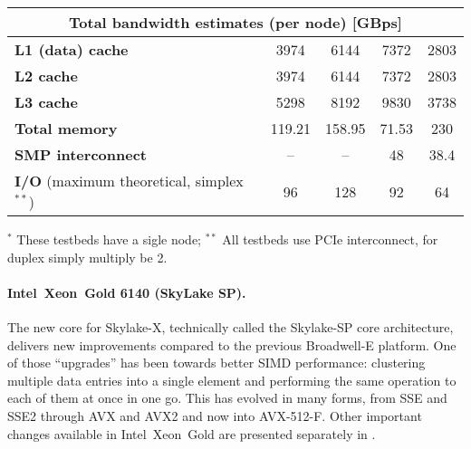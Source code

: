 \begin{table}
\begin{adjustbox}{width=1\textwidth}
\begin{tabular}{l|c|c|c|c|}
\multicolumn{5}{|c|}{\textbf{Total bandwidth estimates (per node) [GBps]}}  \\ \hline
\multicolumn{1}{|l|}{\textbf{L1 (data) cache}} & 3974 & 6144 & 7372 & 2803 \\ \hline
\multicolumn{1}{|l|}{\textbf{L2 cache}} & 3974 & 6144 & 7372 & 2803 \\ \hline
\multicolumn{1}{|l|}{\textbf{L3 cache}} & 5298 & 8192 & 9830 & 3738 \\ \hline
\multicolumn{1}{|l|}{\textbf{Total memory}} & 119.21 & 158.95 & 71.53 & 230 \\ \hline
\multicolumn{1}{|l|}{\textbf{SMP interconnect}} & -- & -- & 48 & 38.4 \\ \hline
\multicolumn{1}{|l|}{\textbf{I/O} (maximum theoretical, simplex$^{**}$)} & 96 & 128 & 92 & 64 \\ \hline
\end{tabular}
\end{adjustbox}
\newline
\raggedright{\footnotesize{
    $^*$ These testbeds have a sigle node;
    $^{**}$ All testbeds use PCIe interconnect, for duplex simply multiply be 2.
}}
\end{table}

\paragraph{Intel\textregistered\ Xeon\textregistered\ Gold 6140 (SkyLake SP).}
The new core for Skylake-X, technically called the Skylake-SP core architecture, delivers new improvements compared to the previous Broadwell-E platform. One of those ``upgrades'' has been towards better SIMD performance: clustering multiple data entries into a single element and performing the same operation to each of them at once in one go. This has evolved in many forms, from SSE and SSE2 through AVX and AVX2 and now into AVX-512-F.
Other important changes available in Intel\textregistered\ Xeon\textregistered\ Gold are presented separately in \cite{INTELXEONGOLD6140}.

